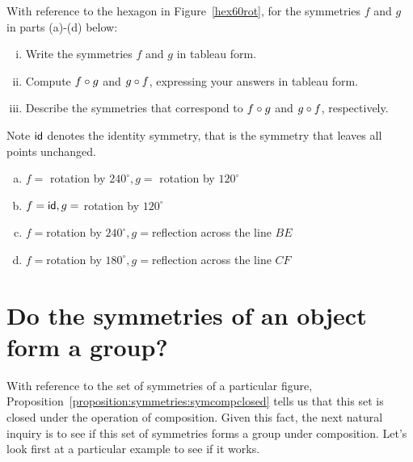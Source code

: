 \begin{exercise}{16}
With reference to the hexagon in Figure~\ref{hex60rot}, for the symmetries $f$ and $g$ in parts (a)-(d) below:
\begin{enumerate}[(i)]
\item
Write the symmetries $f$ and $g$ in tableau form.
\item
Compute $f \circ g$ and $g \circ f$, expressing your answers in tableau form.
\item 
Describe the symmetries that correspond to $f \circ g$ and $g \circ f$, respectively.
\end{enumerate}
\medskip

\noindent
Note ${\sf{i}d}$ denotes the identity symmetry, that is the symmetry that leaves all points unchanged.
\medskip

\begin{enumerate}[(a)]
\item
$f=$ rotation by $240^\circ, g=$ rotation by $120^\circ$
\item
$f={\sf{i}d}, g=$ rotation by $120^\circ$
\item
$f=$rotation by $ 240^\circ, g=$reflection across the line $BE$
\item 
$f=$rotation by $ 180^\circ, g=$reflection across the line $CF$
\end{enumerate}
\end{exercise}

\section{Do the symmetries of an object form a group?\quad
{}}\label{SymmetryGroup}

With reference to the set of symmetries of a particular figure,  Proposition~\ref{proposition:symmetries:symcompclosed} tells us that this set is closed under the operation of composition. Given this fact, the next natural inquiry is to see if this set of symmetries forms a group under composition.  Let's look first at a particular example to see if it works.

